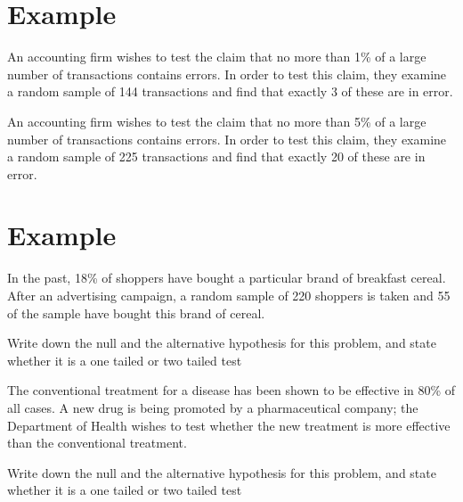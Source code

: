 \documentclass[a4paper,12pt]{article}
\begin{document}
\section{Example}

An accounting firm wishes to test the claim that no more than 1\% of a large
number of transactions contains errors. In order to test this claim, they
examine a random sample of 144 transactions and find that exactly 3 of
these are in error.

An accounting firm wishes to test the claim that no more than 5\% of a large
number of transactions contains errors. In order to test this claim, they examine a
random sample of 225 transactions and find that exactly 20 of these are in error.

\section{Example}

In the past, 18\% of shoppers have bought a particular brand of breakfast cereal.
After an advertising campaign, a random sample of 220 shoppers is taken and 55 of the sample have bought this brand of cereal.

Write down the null and the alternative hypothesis for this problem, and state whether it is a one tailed or two tailed test

The conventional treatment for a disease has been shown to be effective in
80\% of all cases. A new drug is being promoted by a pharmaceutical
company; the Department of Health wishes to test whether the new treatment
is more effective than the conventional treatment.

Write down the null and the alternative hypothesis for this problem, and state whether it is a one tailed or two tailed test
\end{document}
